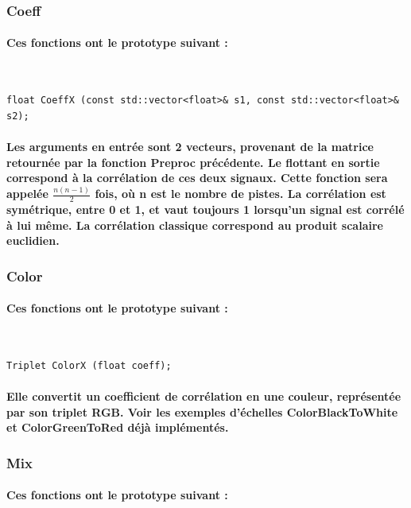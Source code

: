 \documentclass[a4paper]{article}
\begin{document}
\subsubsection{Coeff} \paragraph{Ces fonctions ont le prototype suivant :}
\

\begin{lstlisting}
float CoeffX (const std::vector<float>& s1, const std::vector<float>& s2);
\end{lstlisting}

\paragraph{Les arguments en entrée sont 2 vecteurs, provenant de la matrice
retournée par la fonction Preproc précédente. Le flottant en sortie correspond à
la corrélation de ces deux signaux. Cette fonction sera appelée
$\frac{n(n-1)}{2}$ fois, où n est le nombre de pistes. La corrélation est
symétrique, entre 0 et 1, et vaut toujours 1 lorsqu’un signal est corrélé à lui
même. La corrélation classique correspond au produit scalaire euclidien.}

\subsubsection{Color} \paragraph{Ces fonctions ont le prototype suivant :}
\

\begin{lstlisting}
Triplet ColorX (float coeff);
\end{lstlisting}

\paragraph{Elle convertit un coefficient de corrélation en une couleur,
représentée par son triplet RGB. Voir les exemples d’échelles ColorBlackToWhite
et ColorGreenToRed déjà implémentés.}

\subsubsection{Mix} \paragraph{Ces fonctions ont le prototype suivant :}
\
\end{document}
